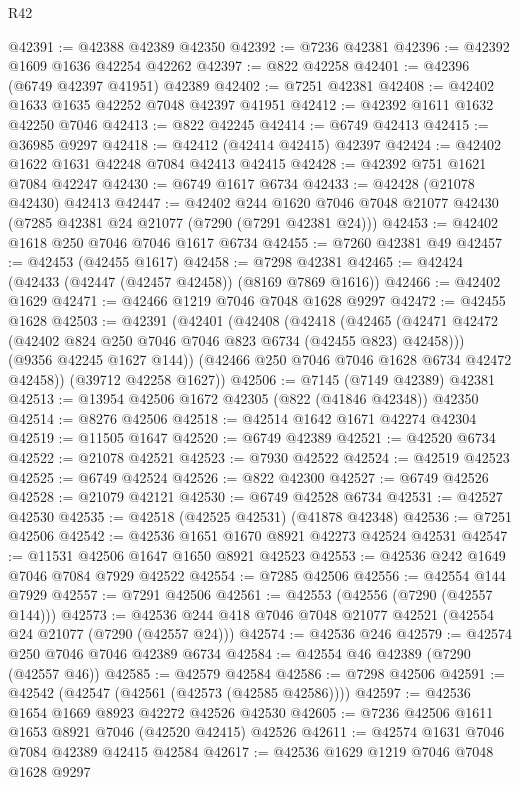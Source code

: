 \begin{lexlean}{R42}
\begin{coremodule}
{@42391 := @42388 @42389 @42350
@42392 := @7236 @42381
@42396 := @42392 @1609 @1636 @42254 @42262
@42397 := @822 @42258
@42401 := @42396 (@6749 @42397 @41951) @42389
@42402 := @7251 @42381
@42408 := @42402 @1633 @1635 @42252 @7048 @42397 @41951
@42412 := @42392 @1611 @1632 @42250 @7046
@42413 := @822 @42245
@42414 := @6749 @42413
@42415 := @36985 @9297
@42418 := @42412 (@42414 @42415) @42397
@42424 := @42402 @1622 @1631 @42248 @7084 @42413 @42415
@42428 := @42392 @751 @1621 @7084 @42247
@42430 := @6749 @1617 @6734
@42433 := @42428 (@21078 @42430) @42413
@42447 := @42402
    @244
    @1620
    @7046
    @7048
    @21077
    @42430
    (@7285 @42381 @24 @21077 (@7290 (@7291 @42381 @24)))
@42453 := @42402 @1618 @250 @7046 @7046 @1617 @6734
@42455 := @7260 @42381 @49
@42457 := @42453 (@42455 @1617)
@42458 := @7298 @42381
@42465 := @42424 (@42433 (@42447 (@42457 @42458)) (@8169 @7869 @1616))
@42466 := @42402 @1629
@42471 := @42466 @1219 @7046 @7048 @1628 @9297
@42472 := @42455 @1628
@42503 := @42391
    (@42401
      (@42408
        (@42418
          (@42465 (@42471 @42472 (@42402 @824 @250 @7046 @7046 @823 @6734 (@42455 @823) @42458)))
          (@9356 @42245 @1627 @144))
        (@42466 @250 @7046 @7046 @1628 @6734 @42472 @42458))
      (@39712 @42258 @1627))
@42506 := @7145 (@7149 @42389) @42381
@42513 := @13954 @42506 @1672 @42305 (@822 (@41846 @42348)) @42350
@42514 := @8276 @42506
@42518 := @42514 @1642 @1671 @42274 @42304
@42519 := @11505 @1647
@42520 := @6749 @42389
@42521 := @42520 @6734
@42522 := @21078 @42521
@42523 := @7930 @42522
@42524 := @42519 @42523
@42525 := @6749 @42524
@42526 := @822 @42300
@42527 := @6749 @42526
@42528 := @21079 @42121
@42530 := @6749 @42528 @6734
@42531 := @42527 @42530
@42535 := @42518 (@42525 @42531) (@41878 @42348)
@42536 := @7251 @42506
@42542 := @42536 @1651 @1670 @8921 @42273 @42524 @42531
@42547 := @11531 @42506 @1647 @1650 @8921 @42523
@42553 := @42536 @242 @1649 @7046 @7084 @7929 @42522
@42554 := @7285 @42506
@42556 := @42554 @144 @7929
@42557 := @7291 @42506
@42561 := @42553 (@42556 (@7290 (@42557 @144)))
@42573 := @42536 @244 @418 @7046 @7048 @21077 @42521 (@42554 @24 @21077 (@7290 (@42557 @24)))
@42574 := @42536 @246
@42579 := @42574 @250 @7046 @7046 @42389 @6734
@42584 := @42554 @46 @42389 (@7290 (@42557 @46))
@42585 := @42579 @42584
@42586 := @7298 @42506
@42591 := @42542 (@42547 (@42561 (@42573 (@42585 @42586))))
@42597 := @42536 @1654 @1669 @8923 @42272 @42526 @42530
@42605 := @7236 @42506 @1611 @1653 @8921 @7046 (@42520 @42415) @42526
@42611 := @42574 @1631 @7046 @7084 @42389 @42415 @42584
@42617 := @42536 @1629 @1219 @7046 @7048 @1628 @9297
}
\end{coremodule}
\end{lexlean}
